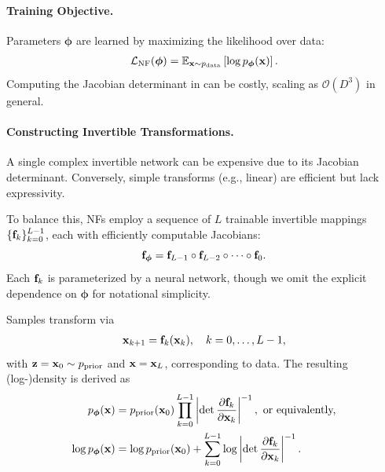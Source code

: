 \paragraph{Training Objective.}
Parameters $\bm{\phi}$ are learned by maximizing the likelihood over data:
\begin{align}\label{eq:nf-training}
\mathcal{L}_{\text{NF}}(\bm{\phi}) = \mathbb{E}_{{\mathbf{x}} \sim p_{\text{data}}} \left[ \log p_{\bm{\phi}}({\mathbf{x}}) \right].
\end{align}
Computing the Jacobian determinant in  can be costly, scaling as $\mathcal{O}(D^3)$ in general.

\paragraph{Constructing Invertible Transformations.}






A single complex invertible network can be expensive due to its Jacobian determinant. Conversely, simple transforms (e.g., linear) are efficient but lack expressivity.


To balance this, NFs employ a sequence of $L$ trainable invertible mappings $\{{\mathbf{f}}_k\}_{k=0}^{L-1}$, each with efficiently computable Jacobians:
\[
{\mathbf{f}}_{\bm{\phi}} = {\mathbf{f}}_{L-1} \circ {\mathbf{f}}_{L-2} \circ \cdots \circ {\mathbf{f}}_0.
\]
Each ${\mathbf{f}}_k$ is parameterized by a neural network, though we omit the explicit dependence on ${\bm{\phi}}$ for notational simplicity.


Samples transform via
\begin{align}\label{eq:nf-seq}
{\mathbf{x}}_{k+1} = {\mathbf{f}}_k({\mathbf{x}}_k), \quad k = 0, \ldots, L-1,
\end{align}
with ${\mathbf{z}}={\mathbf{x}}_0 \sim p_{\text{prior}}$ and ${\mathbf{x}} = {\mathbf{x}}_L$, corresponding to data. The resulting (log-)density is derived as 
\begin{align}\label{eq:multi-nf-density}
\begin{aligned}
    p_{\bm{\phi}}({\mathbf{x}}) &= p_{\text{prior}}({\mathbf{x}}_0) \prod_{k=0}^{L-1} \left| \det \frac{\partial {\mathbf{f}}_k}{\partial {\mathbf{x}}_k} \right|^{-1}, \text{ or equivalently,}\\
\log p_{\bm{\phi}}({\mathbf{x}}) &= \log p_{\text{prior}}({\mathbf{x}}_0) + \sum_{k=0}^{L-1} \log \left| \det \frac{\partial {\mathbf{f}}_k}{\partial {\mathbf{x}}_k} \right|^{-1}.
\end{aligned}
\end{align}


